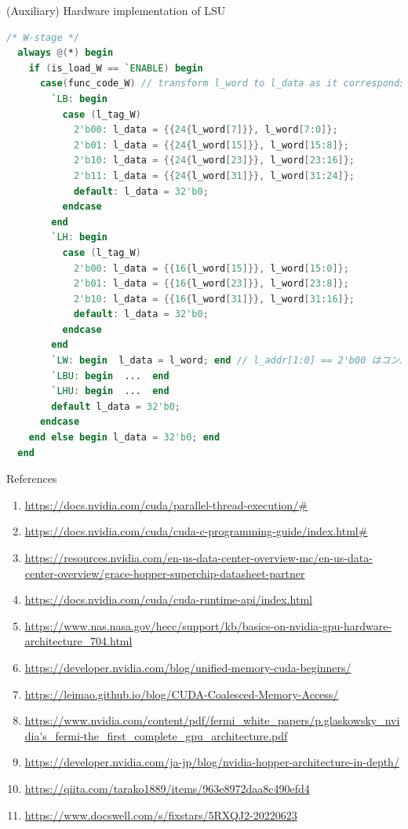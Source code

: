 \documentclass[dvipdfmx, 11pt, aspectratio=169]{beamer}   %
\begin{document}
\begin{frame}[fragile]{(Auxiliary) Hardware implementation of LSU}
  \vspace{-1.5\baselineskip}
    \begin{lstlisting}[language=verilog, basicstyle=\ttfamily\tiny]
  /* W-stage */
  always @(*) begin
    if (is_load_W == `ENABLE) begin
      case(func_code_W) // transform l_word to l_data as it corresponds to func_code
        `LB: begin
          case (l_tag_W)
            2'b00: l_data = {{24{l_word[7]}}, l_word[7:0]};
            2'b01: l_data = {{24{l_word[15]}}, l_word[15:8]};
            2'b10: l_data = {{24{l_word[23]}}, l_word[23:16]};
            2'b11: l_data = {{24{l_word[31]}}, l_word[31:24]};
            default: l_data = 32'b0;
          endcase
        end
        `LH: begin
          case (l_tag_W)
            2'b00: l_data = {{16{l_word[15]}}, l_word[15:0]};
            2'b01: l_data = {{16{l_word[23]}}, l_word[23:8]};
            2'b10: l_data = {{16{l_word[31]}}, l_word[31:16]};
            default: l_data = 32'b0;
          endcase
        end
        `LW: begin  l_data = l_word; end // l_addr[1:0] == 2'b00 はコンパイラが保証
        `LBU: begin  ...  end
        `LHU: begin  ...  end
        default l_data = 32'b0;
      endcase
    end else begin l_data = 32'b0; end
  end
\end{lstlisting}
\end{frame}
\begin{frame}[fragile]{References}
  \begin{enumerate}\footnotesize
    \item \url{https://docs.nvidia.com/cuda/parallel-thread-execution/#}
    \item \url{https://docs.nvidia.com/cuda/cuda-c-programming-guide/index.html#}
    \item \url{https://resources.nvidia.com/en-us-data-center-overview-mc/en-us-data-center-overview/grace-hopper-superchip-datasheet-partner}
    \item \url{https://docs.nvidia.com/cuda/cuda-runtime-api/index.html}
    \item \url{https://www.nas.nasa.gov/hecc/support/kb/basics-on-nvidia-gpu-hardware-architecture_704.html}
    \item \url{https://developer.nvidia.com/blog/unified-memory-cuda-beginners/}
    \item \url{https://leimao.github.io/blog/CUDA-Coalesced-Memory-Access/}
    \item \url{https://www.nvidia.com/content/pdf/fermi_white_papers/p.glaskowsky_nvidia's_fermi-the_first_complete_gpu_architecture.pdf}
    \item \url{https://developer.nvidia.com/ja-jp/blog/nvidia-hopper-architecture-in-depth/}
    \item \url{https://qiita.com/tarako1889/items/963e8972daa8c490efd4}
    \item \url{https://www.docswell.com/s/fixstars/5RXQJ2-20220623}
  \end{enumerate}
\end{frame}
\end{document}
